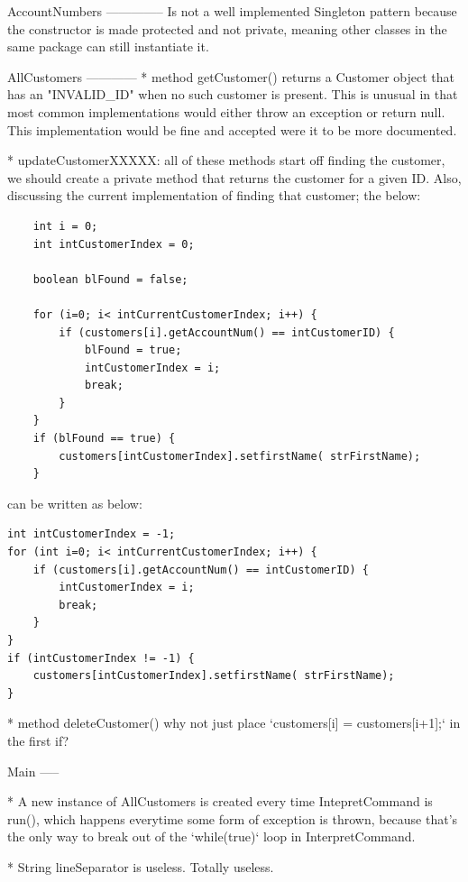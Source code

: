 AccountNumbers
--------------
Is not a well implemented Singleton pattern because the constructor is made protected and not private, meaning other classes in the same package can still instantiate it.


AllCustomers
------------
* method getCustomer() returns a Customer object that has an "INVALID\_ID" when no such customer is present. This is unusual in that most common implementations would either throw an exception or return null. This implementation would be fine and accepted were it to be more documented. 


* updateCustomerXXXXX: all of these methods start off finding the customer, we should create a private method that returns the customer for a given ID. Also, discussing the current implementation of finding that customer; the below: 

\begin{lstlisting}	
	int i = 0;
	int intCustomerIndex = 0;
	
	boolean blFound = false;

	for (i=0; i< intCurrentCustomerIndex; i++) {
		if (customers[i].getAccountNum() == intCustomerID) {
			blFound = true;
			intCustomerIndex = i;
			break;
		}
	}
	if (blFound == true) {
		customers[intCustomerIndex].setfirstName( strFirstName);
	}
\end{lstlisting}
can be written as below: 
\begin{lstlisting}
int intCustomerIndex = -1;
for (int i=0; i< intCurrentCustomerIndex; i++) {
	if (customers[i].getAccountNum() == intCustomerID) {
		intCustomerIndex = i;
		break;
	}
}
if (intCustomerIndex != -1) {
	customers[intCustomerIndex].setfirstName( strFirstName);
}
\end{lstlisting}

* method deleteCustomer() 
why not just place `customers[i] = customers[i+1];` in the first if? 

Main
-----

* A new instance of AllCustomers is created every time IntepretCommand is run(), which happens everytime some form of exception is thrown, because that's the only way to break out of the `while(true)` loop in InterpretCommand. 

* String lineSeparator is useless. Totally useless.

